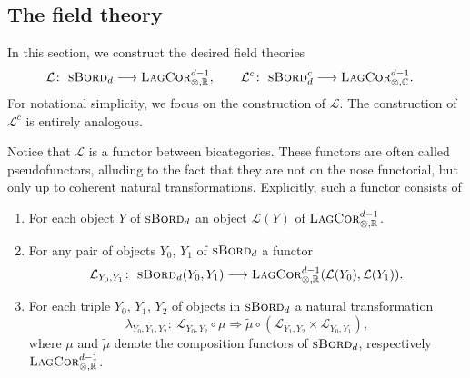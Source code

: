 \documentclass[10pt,a4paper]{amsart}
\numberwithin{equation}{section}
\newcommand{\LagCor}{\textsc{LagCor}}
\newcommand{\R}{\mathbb{R}}
\newcommand{\C}{\mathbb{C}}
\newcommand{\sBord}{\textsc{sBord}}
\begin{document}
\subsection{The field theory} \label{SectionFermionicFieldTheory}

In this section, we construct the desired field theories
\begin{align*}
 \mathcal{L} \colon\ \sBord_d &\longrightarrow \LagCor^{d-1}_{\otimes, \R},\qquad
 \mathcal{L}^c \colon\ \sBord_d^c \longrightarrow \LagCor^{d-1}_{\otimes, \C}.
\end{align*}
For notational simplicity, we focus on the construction of $\mathcal{L}$.
The construction of $\mathcal{L}^c$ is entirely analogous.

Notice that $\mathcal{L}$ is a functor between bicategories.
These functors are often called pseudofunctors, alluding to the fact that they are not on the nose functorial, but only up to coherent natural transformations.
Explicitly, such a functor consists of
\begin{enumerate}\itemsep=0pt
\item[(1)]
For each object $Y$ of $\sBord_d$ an object $\mathcal{L}(Y)$ of $\LagCor_{\otimes, \R}^{d-1}$.
\item[(2)]
For any pair of objects $Y_0$, $Y_1$ of $\sBord_d$ a functor
\begin{equation}
\label{Lfunctor}
\mathcal{L}_{Y_0, Y_1}\colon\ \sBord_d(Y_0, Y_1) \longrightarrow \LagCor_{\otimes, \R}^{d-1}(\mathcal{L}(Y_0), \mathcal{L}(Y_1)).
\end{equation}
\item[(3)]
For each triple $Y_0$, $Y_1$, $Y_2$ of objects in $\sBord_d$ a natural transformation
\begin{equation}
\label{LambdaTransformation}
 \lambda_{Y_0, Y_1, Y_2}\colon\ \mathcal{L}_{Y_0, Y_2} \circ \mu \Longrightarrow \tilde{\mu} \circ (\mathcal{L}_{Y_1, Y_2} \times \mathcal{L}_{Y_0, Y_1}),
\end{equation}
where $\mu$ and $\tilde{\mu}$ denote the composition functors of $\sBord_d$, respectively $\LagCor_{\otimes, \R}^{d-1}$.
\end{enumerate}
\end{document}
